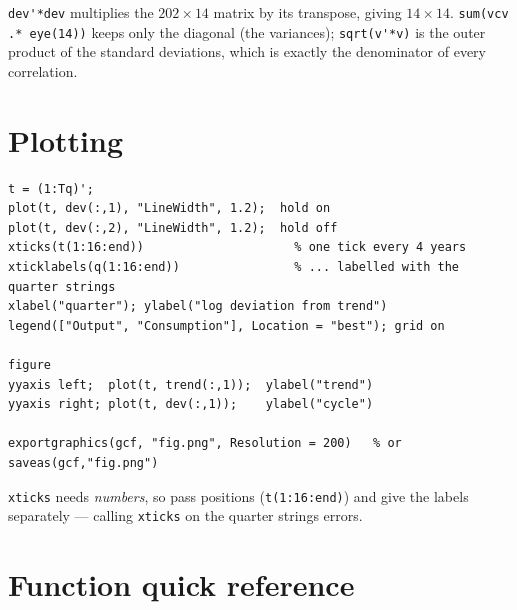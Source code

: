 \documentclass[11pt]{article}
\begin{document}
\lstinline[style=inl]!dev'*dev! multiplies the $202\times14$ matrix by its transpose, giving
$14\times14$. \lstinline[style=inl]!sum(vcv .* eye(14))! keeps only the diagonal (the variances);
\lstinline[style=inl]!sqrt(v'*v)! is the outer product of the standard deviations, which is
exactly the denominator of every correlation.

\section{Plotting}

\begin{lstlisting}
t = (1:Tq)';
plot(t, dev(:,1), "LineWidth", 1.2);  hold on
plot(t, dev(:,2), "LineWidth", 1.2);  hold off
xticks(t(1:16:end))                     % one tick every 4 years
xticklabels(q(1:16:end))                % ... labelled with the quarter strings
xlabel("quarter"); ylabel("log deviation from trend")
legend(["Output", "Consumption"], Location = "best"); grid on

figure
yyaxis left;  plot(t, trend(:,1));  ylabel("trend")
yyaxis right; plot(t, dev(:,1));    ylabel("cycle")

exportgraphics(gcf, "fig.png", Resolution = 200)   % or saveas(gcf,"fig.png")
\end{lstlisting}

\lstinline[style=inl]!xticks! needs \emph{numbers}, so pass positions (\lstinline[style=inl]!t(1:16:end)!) and give
the labels separately --- calling \lstinline[style=inl]!xticks! on the quarter strings errors.

\section{Function quick reference}
\end{document}
